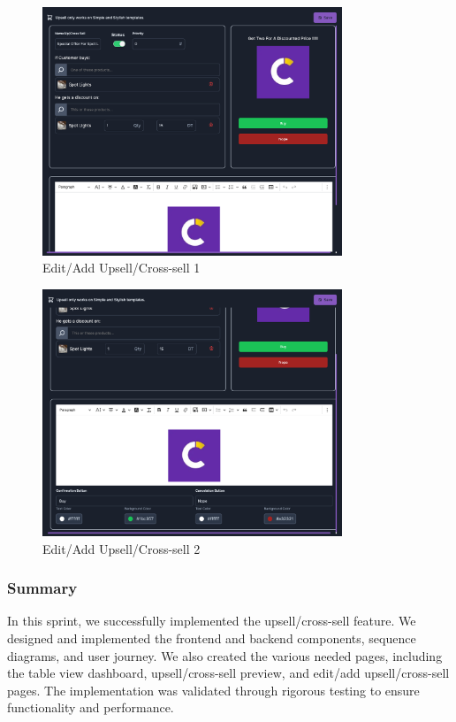 \begin{itemize}
    \begin{figure}[H]
        \centering
        \includegraphics[width=0.8\textwidth]{images/editUpsell1.png}
        \caption{Edit/Add Upsell/Cross-sell 1}
        \label{fig:edit_upsell_one}
    \end{figure}
    \begin{figure}[H]
        \centering
        \includegraphics[width=0.8\textwidth]{images/editUpsell2.png}
        \caption{Edit/Add Upsell/Cross-sell 2}
        \label{fig:edit_upsell_two}
    \end{figure}
\end{itemize}

\subsubsection{Summary}

In this sprint, we successfully implemented the upsell/cross-sell feature. We designed and implemented the frontend and backend components, sequence diagrams, and user journey. We also created the various needed pages, including the table view dashboard, upsell/cross-sell preview, and edit/add upsell/cross-sell pages. The implementation was validated through rigorous testing to ensure functionality and performance.


